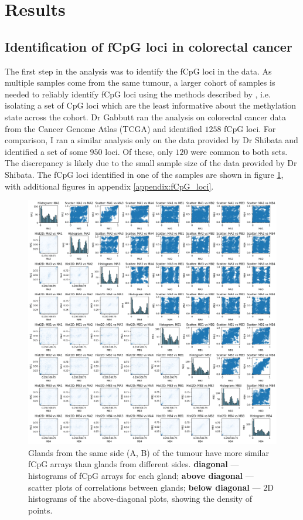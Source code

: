 \section{Results}
\subsection{Identification of fCpG loci in colorectal cancer}
The first step in the analysis was to identify the fCpG loci in the data. As
multiple samples come from the same tumour, a larger cohort of samples is
needed to reliably identify fCpG loci using the methods described by
\cite{gabbutt_evolutionary_2023}, i.e. isolating a set of CpG loci which are
the least informative about the methylation state across the cohort. Dr Gabbutt
ran the analysis on colorectal cancer data from the Cancer Genome Atlas (TCGA)
and identified $1258$ fCpG loci. For comparison, I ran a similar analysis only
on the data provided by Dr Shibata and identified a set of some $950$ loci. Of
these, only $120$ were common to both sets. The discrepancy is likely due to
the small sample size of the data provided by Dr Shibata. The fCpG loci
identified in one of the samples are shown in figure \ref{fig:fCpG_loci_M},
with additional figures in appendix \ref{appendix:fCpG_loci}.

\begin{figure}[h]
    \centering
    \includegraphics[width=\textwidth]{Chapter_5/figures/fCpG_loci_M.png}
    \caption{Glands from the same side (A, B) of the tumour have more similar
    fCpG arrays than glands from different sides. \textbf{diagonal} ---
    histograms of fCpG arrays for each gland; \textbf{above diagonal} ---
    scatter plots of correlations between glands; \textbf{below diagonal} ---
    $2$D histograms of the above-diagonal plots, showing the density of points.}
    \label{fig:fCpG_loci_M}
\end{figure}


